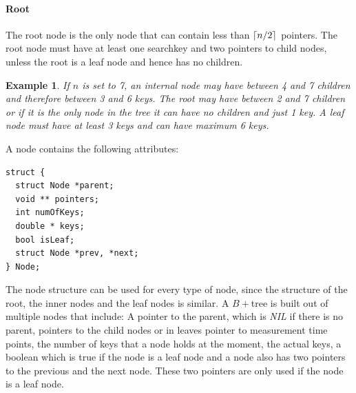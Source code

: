 \documentclass[abstracton,12pt]{scrreprt}
\DeclarePairedDelimiter\ceil{\lceil}{\rceil}
\newtheorem{example}{Example}
\begin{document}
\paragraph{Root}The root node is the only node that can contain less than $\ceil{n/2}$ pointers. The root node must have at least one searchkey and two pointers to child nodes, unless the root is a leaf node and hence has no children.
\begin{example}
	If $n$ is set to 7, an internal node may have between 4 and 7 children and therefore between 3 and 6 keys. The root may have between 2 and 7 children or if it is the only node in the tree it can have no children and just 1 key. A leaf node must have at least 3 keys and can have maximum 6 keys.
\end{example}

A node contains the following attributes: 
\lstset{language=C}
\begin{lstlisting}
struct {
  struct Node *parent;
  void ** pointers;
  int numOfKeys;
  double * keys;
  bool isLeaf;
  struct Node *prev, *next;
} Node;
\end{lstlisting}
\BlankLine
The node structure can be used for every type of node, since the structure of the root, the inner nodes and the leaf nodes is similar. A $B+$tree is built out of multiple nodes that include: A pointer to the parent, which is \emph{NIL} if there is no parent, pointers to the child nodes or in leaves pointer to measurement time points, the number of keys that a node holds at the moment, the actual keys, a boolean which is true if the node is a leaf node and a node also has two pointers to the previous and the next node. These two pointers are only used if the node is a leaf node. 
\end{document}
